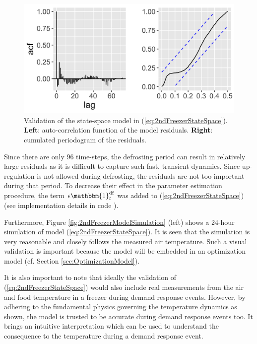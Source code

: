 \begin{figure}[!t]
    \centering
    \includegraphics[width=\columnwidth]{../figures/2ndFreezerModelValidation.png}
    \caption{ Validation of the state-space model in (\ref{eq:2ndFreezerStateSpace}). \textbf{Left}: auto-correlation function of the model residuals. \textbf{Right}: cumulated periodogram of the residuals.}
    \label{fig:2ndFreezerModelValidation}
\end{figure}

Since there are only 96 time-steps, the defrosting period can result in relatively large residuals as it is difficult to capture such fast, transient dynamics. Since up-regulation is not allowed during defrosting, the residuals are not too important during that period. To decrease their effect in the parameter estimation procedure, the term $ \epsilon \mathbbm{1}^{\text{df}}_{t}$ was added to (\ref{eq:2ndFreezerStateSpace}) (see implementation details in code \cite{}).

Furthermore, Figure \ref{fig:2ndFreezerModelSimulation} (left) shows a 24-hour simulation of model (\ref{eq:2ndFreezerStateSpace}). It is seen that the simulation is very reasonable and closely follows the measured air temperature. Such a visual validation is important because the model will be embedded in an optimization model (cf. Section \ref{sec:OptimizationModel}).

It is also important to note that ideally the validation of (\ref{eq:2ndFreezerStateSpace}) would also include real measurements from the air and food temperature in a freezer during demand response events. However, by adhering to the fundamental physics governing the temperature dynamics as shown, the model is trusted to be accurate during demand response events too. It brings an intuitive interpretation which can be used to understand the consequence to the temperature during a demand response event.


